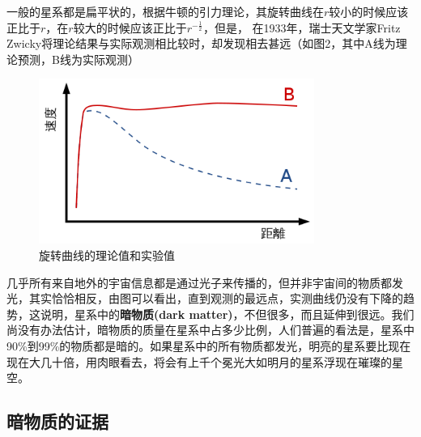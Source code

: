 \documentclass[UTF8]{ctexart}
\begin{document}
一般的星系都是扁平状的，根据牛顿的引力理论，其旋转曲线在$r$较小的时候应该正比于$r$，在$r$较大的时候应该正比于$r^{-\frac12}$，但是，
在1933年，瑞士天文学家Fritz Zwicky将理论结果与实际观测相比较时，却发现相去甚远（如图2，其中A线为理论预测，B线为实际观测）
\begin{figure}[H]
    \centering
    \includegraphics[width=9cm]{langzh-450px-GalacticRotation2.svg.png}
    \caption{旋转曲线的理论值和实验值}
    \label{fig:my_label}
\end{figure}

几乎所有来自地外的宇宙信息都是通过光子来传播的，但并非宇宙间的物质都发光，其实恰恰相反，由图可以看出，直到观测的最远点，实测曲线仍没有下降的趋势，这说明，星系中的\textbf{暗物质(dark matter)}，不但很多，而且延伸到很远。我们尚没有办法估计，暗物质的质量在星系中占多少比例，人们普遍的看法是，星系中90\%到99\%的物质都是暗的。如果星系中的所有物质都发光，明亮的星系要比现在现在大几十倍，用肉眼看去，将会有上千个冕光大如明月的星系浮现在璀璨的星空。

\subsection{暗物质的证据}
\end{document}

